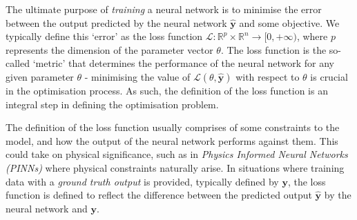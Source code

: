 \documentclass[a4paper,11pt,titlepage]{article}
\theoremstyle{definition}
\theoremstyle{plain}
\theoremstyle{remark}
\begin{document}
The ultimate purpose of \textit{training} a neural network is to minimise the error between the output predicted by the neural network $\mathbf{\hat{y}}$ and some objective. We typically define this ‘error’ as the loss function $\mathcal{L}: \mathbb{R}^p \times \mathbb{R}^n \to [0, +\infty )$, where $p$ represents the dimension of the parameter vector $\theta$. The loss function is the so-called ‘metric’ that determines the performance of the neural network for any given parameter $\theta$ - minimising the value of $\mathcal{L}(\theta, \mathbf{\hat{y}})$ with respect to $\theta$ is crucial in the optimisation process. As such, the definition of the loss function is an integral step in defining the optimisation problem.

The definition of the loss function usually comprises of some constraints to the model, and how the output of the neural network performs against them. This could take on physical significance, such as in \textit{Physics Informed Neural Networks (PINNs)} where physical constraints naturally arise. In situations where training data with a \textit{ground truth output} is provided, typically defined by $\mathbf{y}$, the loss function is defined to reflect the difference between the predicted output $\mathbf{\hat{y}}$ by the neural network and $\mathbf{y}$.
\end{document}
